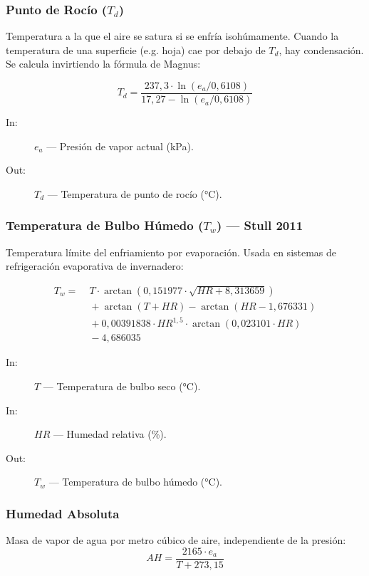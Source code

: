 \subsubsection{Punto de Rocío ($T_d$)}

Temperatura a la que el aire se satura si se enfría isohúmamente. Cuando la temperatura
de una superficie (e.g. hoja) cae por debajo de $T_d$, hay condensación. Se calcula
invirtiendo la fórmula de Magnus:

\[
T_d = \frac{237{,}3 \cdot \ln(e_a / 0{,}6108)}{17{,}27 - \ln(e_a / 0{,}6108)}
\]

\begin{description}
        \item [In:] $e_a$ — Presión de vapor actual (kPa).
    \item [Out:] $T_d$ — Temperatura de punto de rocío (°C).
\end{description}

\subsubsection{Temperatura de Bulbo Húmedo ($T_w$) — Stull 2011}

Temperatura límite del enfriamiento por evaporación. Usada en sistemas de
refrigeración evaporativa de invernadero:

{\small
\[
\begin{aligned}
T_w = &\; T \cdot \arctan\!\left(0{,}151977 \cdot \sqrt{HR + 8{,}313659}\right) \\
      &\; + \arctan(T+HR) - \arctan(HR-1{,}676331) \\
      &\; + 0{,}00391838 \cdot HR^{1{,}5} \cdot \arctan(0{,}023101 \cdot HR) \\
      &\; - 4{,}686035
\end{aligned}
\]
}

\begin{description}
        \item [In:] $T$ — Temperatura de bulbo seco (°C).
    \item [In:] $HR$ — Humedad relativa (\%).
    \item [Out:] $T_w$ — Temperatura de bulbo húmedo (°C).
\end{description}

\subsubsection{Humedad Absoluta}

Masa de vapor de agua por metro cúbico de aire, independiente de la presión:
\[
AH = \frac{2165 \cdot e_a}{T + 273{,}15}
\]

